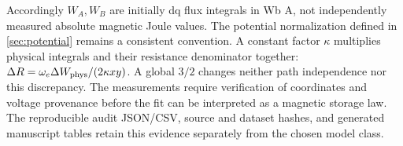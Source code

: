 Accordingly $W_A,W_B$ are initially dq flux integrals in Wb A, not independently
measured absolute magnetic Joule values. The potential normalization defined
in \cref{sec:potential} remains a consistent convention. A constant factor
$\kappa$ multiplies physical integrals and their resistance denominator
together: $\Delta R=\omega_e\Delta W_{\rm phys}/(2\kappa xy)$.
A global $3/2$ changes neither path independence nor this discrepancy.
The measurements require verification of coordinates and voltage provenance
before the fit can be interpreted as a magnetic storage law. The reproducible
audit JSON/CSV, source and dataset hashes, and generated manuscript tables
retain this evidence separately from the chosen model class.
